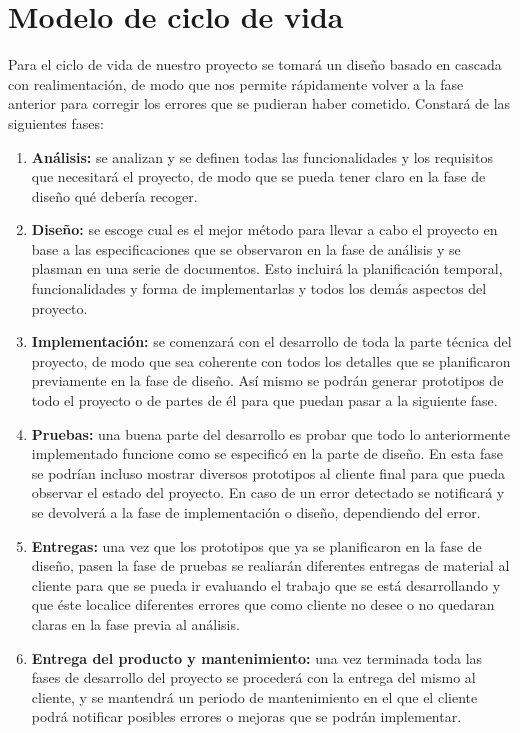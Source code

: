 \documentclass[palatino]{apuntes}
\begin{document}
\section{Modelo de ciclo de vida}

Para el ciclo de vida de nuestro proyecto se tomará un diseño basado en cascada con realimentación, de modo que nos permite rápidamente volver a la fase anterior para corregir los errores que se pudieran haber cometido. Constará de las siguientes fases:

\begin{enumerate}
    \item \textbf{Análisis:} se analizan y se definen todas las funcionalidades y los requisitos que necesitará el proyecto, de modo que se pueda tener claro en la fase de diseño qué debería recoger.
    \item \textbf{Diseño:} se escoge cual es el mejor método para llevar a cabo el proyecto en base a las especificaciones que se observaron en la fase de análisis y se plasman en una serie de documentos. Esto incluirá  la planificación temporal, funcionalidades y forma de implementarlas y todos los demás aspectos del proyecto.
    \item \textbf{Implementación:} se comenzará con el desarrollo de toda la parte técnica del proyecto, de modo que sea coherente con todos los detalles que se planificaron previamente en la fase de diseño. Así mismo se podrán generar prototipos de todo el proyecto o de partes de él para que puedan pasar a la siguiente fase.
    \item \textbf{Pruebas:} una buena parte del desarrollo es probar que todo lo anteriormente implementado funcione como se especificó en la parte de diseño. En esta fase se podrían incluso mostrar diversos prototipos al cliente final para que pueda observar el estado del proyecto. En caso de un error detectado se notificará y se devolverá a la fase de implementación o diseño, dependiendo del error.
    \item \textbf{Entregas:} una vez que los prototipos que ya se planificaron en la fase de diseño, pasen la fase de pruebas se realiarán diferentes entregas de material al cliente para que se pueda ir evaluando el trabajo que se está desarrollando y que éste localice diferentes errores que como cliente no desee o no quedaran claras en la fase previa al análisis.
    \item \textbf{Entrega del producto y mantenimiento:} una vez terminada toda las fases de desarrollo del proyecto se procederá con la entrega del mismo al cliente, y se mantendrá un periodo de mantenimiento en el que el cliente podrá notificar posibles errores o mejoras que se podrán implementar.
\end{enumerate}
\end{document}
